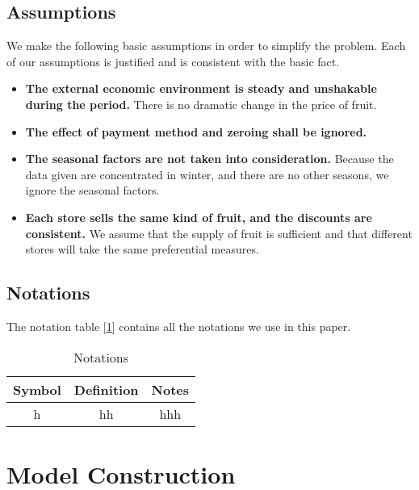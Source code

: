 \documentclass{mcmthesis}
\begin{document}
\subsection{Assumptions}
We make the following basic assumptions in order to simplify the problem. Each
of our assumptions is justified and is consistent with the basic fact.
\begin{itemize}
\item \textbf{The external economic environment is steady and unshakable during the period.} There is no dramatic change in the price of fruit.
\item \textbf{The effect of payment method and zeroing shall be ignored.}
\item \textbf{The seasonal factors are not taken into consideration.} Because the data given are concentrated in winter, and there are no other seasons, we ignore the seasonal factors.
\item \textbf{Each store sells the same kind of fruit, and the discounts are consistent.} We assume that the supply of fruit is sufficient and that different stores will take the same preferential measures.
\end{itemize}

\subsection{Notations}
The notation table [\ref{table-notations}] contains all the notations we use in this paper.
\begin{table}[h]
    \centering
    \caption{Notations} \label{table-notations}
    \begin{tabular}{ccc}
    \toprule
        Symbol & Definition & Notes\\
    \midrule
        h & hh & hhh\\ 
    \bottomrule
    \end{tabular}
\end{table}

\section{Model Construction}
\end{document}
